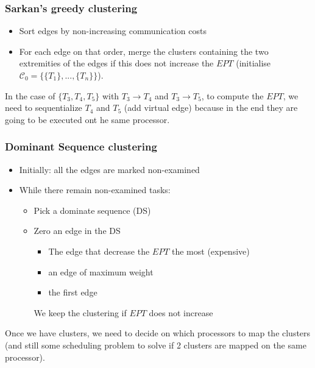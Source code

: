 \subsubsection*{Sarkan's greedy clustering}
\begin{itemize}
\item Sort edges by non-increasing communication costs
\item For each edge on that order, merge the clusters containing the two extremities of the edges if this does not increase the $EPT$ (initialise $\mathcal{C}_0=\{\{T_1\},...,\{T_n\}\}$).
\end{itemize}


In the case of $\{T_3,T_4,T_5\}$ with $T_3 \to T_4$ and $T_3 \to T_5$, to compute the $EPT$, we need to sequentialize $T_4$ and $T_5$ (add virtual edge) because in the end they are going to be executed ont he same processor.

\subsubsection*{Dominant Sequence clustering} 
\begin{itemize}
\item Initially: all the edges are marked non-examined
\item While there remain non-examined tasks:
\begin{itemize}
\item Pick a dominate sequence (DS)
\item Zero an edge in the DS
\begin{itemize}
\item The edge that decrease the $EPT$ the most (expensive)
\item an edge of maximum weight
\item the first edge
\end{itemize}
We keep the clustering if $EPT$ does not increase
\end{itemize}
\end{itemize}

Once we have clusters, we need to decide on which processors to map the clusters (and still some scheduling problem to solve if 2 clusters are mapped on the same processor).
